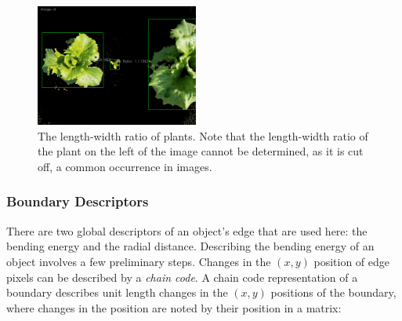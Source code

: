 \documentclass[letterpaper]{report}
\begin{document}
{\begin{figure}[h!]
	\centering
	\includegraphics[height=4cm]{./figures/shape-lw-ratio.jpg}
	\caption[Shape attribute: Length-Width ratio]{The length-width ratio of plants. Note that the length-width ratio of the plant on the left of the image cannot be determined, as it is cut off, a common occurrence in images.}
	\label{fig:shape-area}
\end{figure}

\subsubsection{Boundary Descriptors}
There are two global descriptors of an object's edge that are used here: the bending energy and the radial distance. Describing the bending energy of an object involves a few preliminary steps. Changes in the $(x,y)$ position of edge pixels can be described by a \textit{chain code}. A chain code representation of a boundary describes unit length changes in the $(x,y)$ positions of the boundary,  where changes in the position are noted by their position in a matrix:

}
\end{document}
